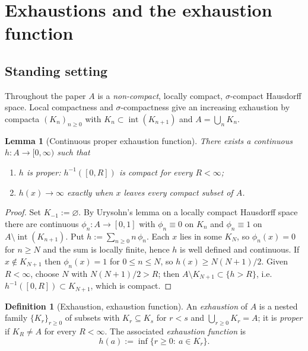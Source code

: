 \documentclass[11pt,a4paper]{article}
\numberwithin{equation}{section}
\theoremstyle{plain}
\newtheorem{lemma}[theorem]{Lemma}
\theoremstyle{definition}
\newtheorem{definition}[theorem]{Definition}
\theoremstyle{remark}
\begin{document}
\section{Exhaustions and the exhaustion function}
\label{sec:exhaustions}

\subsection{Standing setting}

Throughout the paper $A$ is a \emph{non-compact}, locally compact, $\sigma$-compact
Hausdorff space. Local compactness and $\sigma$-compactness give an increasing exhaustion
by compacta $(K_n)_{n\ge0}$ with $K_n\subset\operatorname{int}(K_{n+1})$ and
$A=\bigcup_n K_n$.

\begin{lemma}[Continuous proper exhaustion function]\label{lem:proper-exhaustion}
There exists a continuous $h:A\to[0,\infty)$ such that
\begin{enumerate}
\item[(i)] $h$ is proper: $h^{-1}([0,R])$ is compact for every $R<\infty$;
\item[(ii)] $h(x)\to\infty$ exactly when $x$ leaves every compact subset of $A$.
\end{enumerate}
\end{lemma}

\begin{proof}
Set $K_{-1}:=\varnothing$. By Urysohn's lemma on a locally compact Hausdorff space there
are continuous $\phi_n:A\to[0,1]$ with $\phi_n\equiv0$ on $K_n$ and $\phi_n\equiv1$ on
$A\setminus\operatorname{int}(K_{n+1})$. Put $h:=\sum_{n\ge0} n\,\phi_n$. Each $x$ lies in
some $K_N$, so $\phi_n(x)=0$ for $n\ge N$ and the sum is locally finite, hence $h$ is
well defined and continuous. If $x\notin K_{N+1}$ then $\phi_n(x)=1$ for $0\le n\le N$,
so $h(x)\ge N(N+1)/2$. Given $R<\infty$, choose $N$ with $N(N+1)/2>R$; then
$A\setminus K_{N+1}\subset\{h>R\}$, i.e.\ $h^{-1}([0,R])\subset K_{N+1}$, which is compact.
\end{proof}

\begin{definition}[Exhaustion, exhaustion function]\label{def:exhaustion}
An \emph{exhaustion} of $A$ is a nested family $\{K_r\}_{r\ge0}$ of subsets with
$K_r\subseteq K_s$ for $r<s$ and $\bigcup_{r\ge0}K_r=A$; it is \emph{proper} if
$K_R\ne A$ for every $R<\infty$. The associated \emph{exhaustion function} is
\[
h(a):=\inf\{r\ge0:\ a\in K_r\}.
\]
\end{definition}
\end{document}
